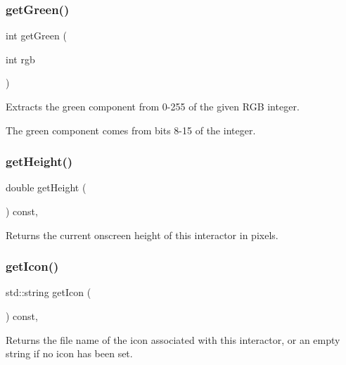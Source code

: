 \subsubsection{\texorpdfstring{get\+Green()}{getGreen()}}
{\footnotesize\ttfamily int get\+Green (\begin{DoxyParamCaption}\item[{int}]{rgb }\end{DoxyParamCaption})\hspace{0.3cm}{\ttfamily [static]}}



Extracts the green component from 0-\/255 of the given R\+GB integer. 

The green component comes from bits 8-\/15 of the integer. \mbox{\label{classGInteractor_a1e7e353362434072875264cf95629f99}} 
\subsubsection{\texorpdfstring{get\+Height()}{getHeight()}}
{\footnotesize\ttfamily double get\+Height (\begin{DoxyParamCaption}{ }\end{DoxyParamCaption}) const\hspace{0.3cm}{\ttfamily [virtual]}, {\ttfamily [inherited]}}



Returns the current onscreen height of this interactor in pixels. 

\mbox{\label{classGInteractor_aaed62a73004939a64da6f0eb9eb64d73}} 
\subsubsection{\texorpdfstring{get\+Icon()}{getIcon()}}
{\footnotesize\ttfamily std\+::string get\+Icon (\begin{DoxyParamCaption}{ }\end{DoxyParamCaption}) const\hspace{0.3cm}{\ttfamily [virtual]}, {\ttfamily [inherited]}}



Returns the file name of the icon associated with this interactor, or an empty string if no icon has been set. 

